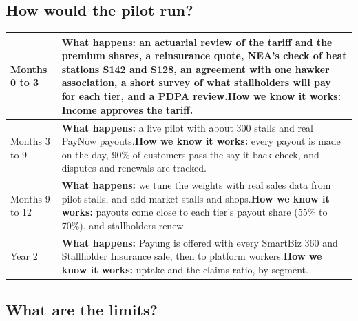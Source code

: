 \documentclass[11pt,a4paper]{article}
\begin{document}
\subsection{How would the pilot run?}

{\small
\begin{xltabular}{\textwidth}{|K{2.6cm}|Y|}
\hline
Months 0 to 3 & \textbf{What happens:} an actuarial review of the tariff and the premium shares, a reinsurance quote, NEA's check of heat stations S142 and S128, an agreement with one hawker association, a short survey of what stallholders will pay for each tier, and a PDPA review.\newline \textbf{How we know it works:} Income approves the tariff. \\
\hline
Months 3 to 9 & \textbf{What happens:} a live pilot with about 300 stalls and real PayNow payouts.\newline \textbf{How we know it works:} every payout is made on the day, 90\% of customers pass the say-it-back check, and disputes and renewals are tracked. \\
\hline
Months 9 to 12 & \textbf{What happens:} we tune the weights with real sales data from pilot stalls, and add market stalls and shops.\newline \textbf{How we know it works:} payouts come close to each tier's payout share (55\% to 70\%), and stallholders renew. \\
\hline
Year 2 & \textbf{What happens:} Payung is offered with every SmartBiz 360 and Stallholder Insurance sale, then to platform workers.\newline \textbf{How we know it works:} uptake and the claims ratio, by segment. \\
\hline
\end{xltabular}}

\subsection{What are the limits?}
\end{document}

